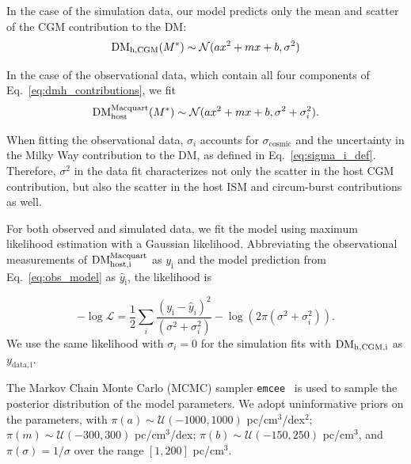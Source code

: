 \documentclass[twocolumn,linenumbers]{aastex631}
\newcommand{\dm}{\ensuremath{\rm DM}}
\newcommand{\dmhm}{\ensuremath{{\rm DM}_\textrm{host}^\textrm{Macquart}}}
\newcommand{\dmhcgm}{\ensuremath{{\rm DM}_\textrm{h,CGM}}}
\begin{document}
In the case of the simulation data, our model predicts only the mean and scatter of the CGM contribution to the DM:
\begin{equation}
    \dmhcgm(M^*) \sim \mathcal{N}(a x^2 + m x + b , \sigma^2)\label{eq:sim_model}
\end{equation}


In the case of the observational data, which contain all four components of Eq.~\ref{eq:dmh_contributions}, we fit
\begin{equation}
    \dmhm(M^*) \sim \mathcal{N}(a x^2 + m x + b, \sigma^2 + \sigma_i^2)\label{eq:obs_model}.
\end{equation}

When fitting the observational data, $\sigma_i$ accounts for $\sigma_\mathrm{cosmic}$ and the uncertainty in the Milky Way contribution to the DM, as defined in Eq.~\ref{eq:sigma_i_def}. Therefore, $\sigma^2$ in the data fit characterizes not only the scatter in the host CGM contribution, but also the scatter in the host ISM and circum-burst contributions as well.

For both observed and simulated data, we fit the model using maximum likelihood estimation with a Gaussian likelihood. Abbreviating the observational measurements of $\dm^\mathrm{Macquart}_\mathrm{host,i}$ as $y_\mathrm{i}$ and the model prediction from Eq.~\ref{eq:obs_model} as $\hat{y}_\mathrm{i}$, the likelihood is

\begin{equation}
    -\log \mathcal{L} = \dfrac{1}{2} \sum_{i} \dfrac{(y_\mathrm{i} - \hat{y}_{i})^2}{(\sigma^2 + \sigma_i^2)} - \log(2\pi(\sigma^2 + \sigma_i^2)).
\end{equation}
We use the same likelihood with $\sigma_i = 0$ for the simulation fits with $\dm_\mathrm{h,CGM,i}$ as $y_\mathrm{data,i}$. 

The Markov Chain Monte Carlo (MCMC) sampler \texttt{emcee}~\citep{foreman_mackey2013emcee} is used to sample the posterior distribution of the model parameters. We adopt uninformative priors on the parameters, with $\pi(a) \sim \mathcal{U}(-1000,1000)$ pc/cm$^{3}$/dex$^2$; $\pi(m) \sim \mathcal{U}(-300,300)$ pc/cm$^{3}$/dex;  $\pi(b) \sim \mathcal{U}(-150,250)$ pc/cm$^{3}$, and $\pi(\sigma) = 1/\sigma$ over the range $[1,200]$ pc/cm$^{3}$.
\end{document}
